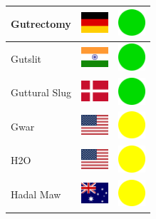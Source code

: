 \documentclass[12pt, a4paper, twoside]{report}
\begin{document}
\begin{center}
\begin{longtable}{|p{5cm}|p{2cm}|p{2cm}|}
 Gutrectomy                                                 & \includegraphics[width=1cm]{../4x3/de} &   \includegraphics[width=1cm]{../likes/y} \\ \hline
 Gutslit                                                    & \includegraphics[width=1cm]{../4x3/in} &   \includegraphics[width=1cm]{../likes/y} \\ \hline
 Guttural Slug                                              & \includegraphics[width=1cm]{../4x3/dk} &   \includegraphics[width=1cm]{../likes/y} \\ \hline
 Gwar                                                       & \includegraphics[width=1cm]{../4x3/us} &   \includegraphics[width=1cm]{../likes/m} \\ \hline
 H2O                                                        & \includegraphics[width=1cm]{../4x3/us} &   \includegraphics[width=1cm]{../likes/m} \\ \hline
 Hadal Maw                                                  & \includegraphics[width=1cm]{../4x3/au} &   \includegraphics[width=1cm]{../likes/m} \\ \hline

\end{longtable}
\end{center}
\end{document}
